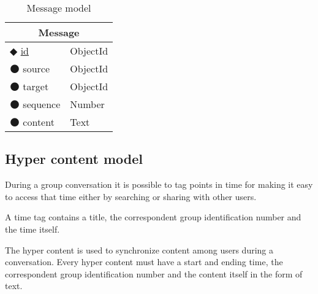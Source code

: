 \begin{table}[H]
\centering
\label{my-label}
    \begin{tabular}{|ll|}
        \hline
        \multicolumn{2}{|c|}{\textbf{Message}}                             \\ \hline
        $\Diamondblack$ \underline{id}  & ObjectId                      \\ 
        $\medbullet$ source           & ObjectId                         \\ 
        $\medbullet$ target      & ObjectId                         \\ 
        $\medbullet$ sequence      & Number                         \\ 
        $\medbullet$ content      & Text                         \\ \hline
    \end{tabular}
\caption{Message model}
\end{table}

\subsection{Hyper content model}

During a group conversation it is possible to tag points in time for making it easy to access that time either by searching or sharing with other users.

A time tag contains a title, the correspondent group identification number and the time itself.

The hyper content is used to synchronize content among users during a conversation. Every hyper content must have a start and ending time, the correspondent group identification number and the content itself in the form of text.


